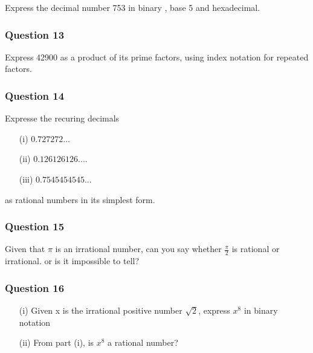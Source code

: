 \documentclass[]{report}
\begin{document}
Express the decimal number 753 in binary , base 5 and hexadecimal.

\subsubsection*{Question 13}

Express 42900 as a product of its prime factors, using index notation for repeated factors.

\subsubsection*{Question 14}

Expresse the recuring decimals 
\begin{itemize}
\item[(i)] $0.727272\ldots$
\item[(ii)] $0.126126126....$
\item[(iii)] $0.7545454545...$
\end{itemize} 
as rational numbers in its simplest form.

\subsubsection*{Question 15}
Given that $\pi$ is an irrational number, can you say whether $\frac{\pi}{2}$ is rational or irrational.
or is it impossible to tell?

\subsubsection*{Question 16}
\begin{itemize}
\item[(i)] Given x is the irrational positive number $\sqrt{2}$, express $x^8$ in binary notation\\
\item[(ii)] From part (i), is $x^8$ a rational number?
\end{itemize}

\end{document}
